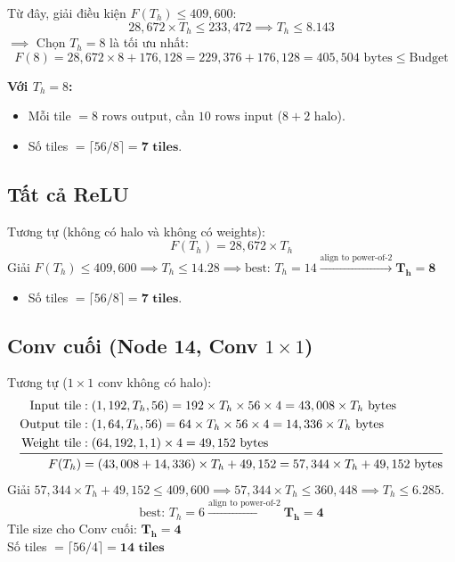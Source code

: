 \documentclass[11pt,a4paper]{article}
\begin{document}
Từ đây, giải điều kiện $F(T_h) \le 409,600$:
$$28,672 \times T_h \le 233,472 \implies T_h \le 8.143$$
$\implies$ Chọn $T_h = 8$ là tối ưu nhất:
$$F(8) = 28,672 \times 8 + 176,128 = 229,376 + 176,128 = 405,504\text{ bytes} \le \text{Budget}$$

\textbf{Với $T_h = 8$:}
\begin{itemize}
    \item Mỗi tile $= 8\text{ rows output}$, cần $10\text{ rows input}$ ($8 + 2\text{ halo}$).
    \item Số tiles $= \lceil 56/8 \rceil = \mathbf{7\text{ tiles}}$.
\end{itemize}

\subsection{Tất cả ReLU}
Tương tự (không có halo và không có weights):
$$F(T_h) = 28,672 \times T_h$$
Giải $F(T_h) \le 409,600 \implies T_h \le 14.28 \implies \text{best: } T_h = 14 \xrightarrow{\text{align to power-of-2}} \mathbf{T_h = 8}$
\begin{itemize}
    \item Số tiles $= \lceil 56/8 \rceil = \mathbf{7\text{ tiles}}$.
\end{itemize}

\newpage

\subsection{Conv cuối (Node 14, Conv $1\times 1$)}
Tương tự ($1\times 1$ conv không có halo):
\begin{align*}
\text{Input tile} &: (1, 192, T_h, 56) = 192 \times T_h \times 56 \times 4 = 43,008 \times T_h\text{ bytes} \\
\text{Output tile} &: (1, 64, T_h, 56) = 64 \times T_h \times 56 \times 4 = 14,336 \times T_h\text{ bytes} \\
\text{Weight tile} &: (64, 192, 1, 1) \times 4 = 49,152\text{ bytes} \\
\midrule
F(T_h) &= (43,008 + 14,336) \times T_h + 49,152 = 57,344 \times T_h + 49,152\text{ bytes}
\end{align*}
Giải $57,344 \times T_h + 49,152 \le 409,600 \implies 57,344 \times T_h \le 360,448 \implies T_h \le 6.285$.
$$\text{best: } T_h = 6 \xrightarrow{\text{align to power-of-2}} \mathbf{T_h = 4}$$
Tile size cho Conv cuối: $\mathbf{T_h = 4}$ \\
Số tiles $= \lceil 56/4 \rceil = \mathbf{14\text{ tiles}}$
\end{document}
